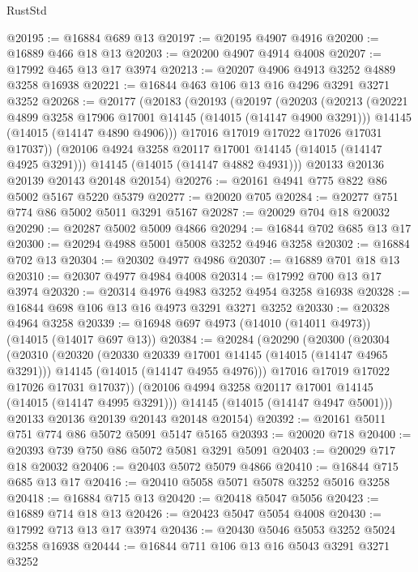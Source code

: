 \begin{lexlean}{RustStd}
\begin{coremodule}
@20195 := @16884 @689 @13
@20197 := @20195 @4907 @4916
@20200 := @16889 @466 @18 @13
@20203 := @20200 @4907 @4914 @4008
@20207 := @17992 @465 @13 @17 @3974
@20213 := @20207 @4906 @4913 @3252 @4889 @3258 @16938
@20221 := @16844 @463 @106 @13 @16 @4296 @3291 @3271 @3252
@20268 := @20177
    (@20183
      (@20193
        (@20197
          (@20203
            (@20213
              (@20221 @4899 @3258 @17906 @17001 @14145 (@14015 (@14147 @4900 @3291)))
              @14145
              (@14015 (@14147 @4890 @4906)))
            @17016
            @17019
            @17022
            @17026
            @17031
            @17037))
        (@20106 @4924 @3258 @20117 @17001 @14145 (@14015 (@14147 @4925 @3291)))
        @14145
        (@14015 (@14147 @4882 @4931)))
      @20133
      @20136
      @20139
      @20143
      @20148
      @20154)
@20276 := @20161 @4941 @775 @822 @86 @5002 @5167 @5220 @5379
@20277 := @20020 @705
@20284 := @20277 @751 @774 @86 @5002 @5011 @3291 @5167
@20287 := @20029 @704 @18 @20032
@20290 := @20287 @5002 @5009 @4866
@20294 := @16844 @702 @685 @13 @17
@20300 := @20294 @4988 @5001 @5008 @3252 @4946 @3258
@20302 := @16884 @702 @13
@20304 := @20302 @4977 @4986
@20307 := @16889 @701 @18 @13
@20310 := @20307 @4977 @4984 @4008
@20314 := @17992 @700 @13 @17 @3974
@20320 := @20314 @4976 @4983 @3252 @4954 @3258 @16938
@20328 := @16844 @698 @106 @13 @16 @4973 @3291 @3271 @3252
@20330 := @20328 @4964 @3258
@20339 := @16948 @697 @4973 (@14010 (@14011 @4973)) (@14015 (@14017 @697 @13))
@20384 := @20284
    (@20290
      (@20300
        (@20304
          (@20310
            (@20320
              (@20330 @20339 @17001 @14145 (@14015 (@14147 @4965 @3291)))
              @14145
              (@14015 (@14147 @4955 @4976)))
            @17016
            @17019
            @17022
            @17026
            @17031
            @17037))
        (@20106 @4994 @3258 @20117 @17001 @14145 (@14015 (@14147 @4995 @3291)))
        @14145
        (@14015 (@14147 @4947 @5001)))
      @20133
      @20136
      @20139
      @20143
      @20148
      @20154)
@20392 := @20161 @5011 @751 @774 @86 @5072 @5091 @5147 @5165
@20393 := @20020 @718
@20400 := @20393 @739 @750 @86 @5072 @5081 @3291 @5091
@20403 := @20029 @717 @18 @20032
@20406 := @20403 @5072 @5079 @4866
@20410 := @16844 @715 @685 @13 @17
@20416 := @20410 @5058 @5071 @5078 @3252 @5016 @3258
@20418 := @16884 @715 @13
@20420 := @20418 @5047 @5056
@20423 := @16889 @714 @18 @13
@20426 := @20423 @5047 @5054 @4008
@20430 := @17992 @713 @13 @17 @3974
@20436 := @20430 @5046 @5053 @3252 @5024 @3258 @16938
@20444 := @16844 @711 @106 @13 @16 @5043 @3291 @3271 @3252

\end{coremodule}
\end{lexlean}
